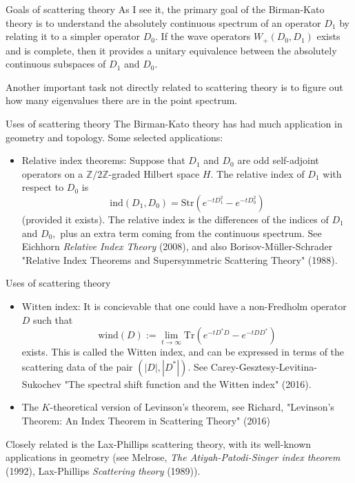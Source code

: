 \documentclass{beamer}
\numberwithin{equation}{section}
\theoremstyle{plain}
\theoremstyle{plain}
\theoremstyle{definition}
\theoremstyle{plain}
\theoremstyle{plain}
\theoremstyle{definition}
\newcommand{\Itgr}{\mathbb{Z}}
\newcommand{\Tr}{\mathrm{Tr}}
\begin{document}
\begin{frame}{Goals of scattering theory}
  As I see it, the primary goal of the Birman-Kato theory is to understand the absolutely continuous spectrum of an operator $D_1$ by relating it to a simpler operator $D_0.$
  If the wave operators $W_{+}(D_0,D_1)$ exists and is complete, then it provides a unitary equivalence between the absolutely continuous subspaces of $D_1$ and $D_0.$

  Another important task not directly related to scattering theory is to figure out how many eigenvalues there are in the point spectrum.
\end{frame}



\begin{frame}{Uses of scattering theory}
The Birman-Kato theory has had much application in geometry and topology. Some selected applications: \pause
\begin{itemize}
\item{} Relative index theorems: Suppose that $D_1$ and $D_0$ are odd self-adjoint operators on a $\Itgr/2\Itgr$-graded Hilbert space $H.$ The relative index of $D_1$ with respect to $D_0$ is
\[
\mathrm{ind}(D_1,D_0) = \mathrm{Str}(e^{-tD_1^2}-e^{-tD_0^2})
\]
(provided it exists). The relative index is the differences of the indices of $D_1$ and $D_0,$ plus an extra term coming from the continuous spectrum. See Eichhorn \emph{Relative Index Theory} (2008), and also Borisov-M\"uller-Schrader "Relative Index Theorems and Supersymmetric Scattering Theory" (1988).\pause
\end{itemize}
\end{frame}


\begin{frame}{Uses of scattering theory}
\begin{itemize}
\item{} Witten index: It is concievable that one could have a non-Fredholm operator $D$ such that
\[
\mathrm{wind}(D) := \lim_{t\to\infty}\Tr(e^{-tD^*D}-e^{-tDD^*})
\]
exists. This is called the Witten index, and can be expressed in terms of the scattering data of the pair $(|D|,|D^*|).$ See Carey-Gesztesy-Levitina-Sukochev "The spectral shift function and the Witten index" (2016).
\item{} The $K$-theoretical version of Levinson's theorem, see Richard, "Levinson’s Theorem: An Index Theorem in Scattering Theory" (2016)\pause
\end{itemize}
Closely related is the Lax-Phillips scattering theory, with its well-known applications in geometry (see Melrose, \emph{The Atiyah-Patodi-Singer index theorem} (1992), Lax-Phillips \emph{Scattering theory} (1989)).

\end{frame}
\end{document}
